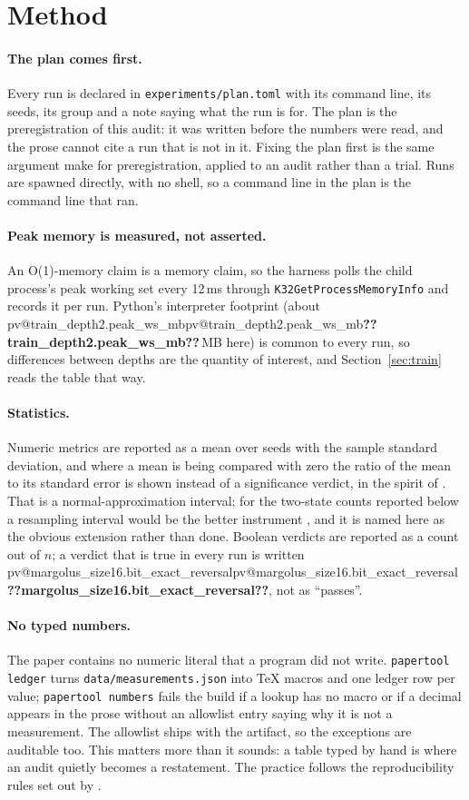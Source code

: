 \documentclass[11pt,a4paper]{article}
\makeatletter
\newcommand{\val}[1]{\ifcsname pv@#1\endcsname\csname pv@#1\endcsname\else\textbf{??#1??}\fi}
\makeatother
\begin{document}
\section{Method}
\label{sec:method}

\paragraph{The plan comes first.} Every run is declared in \texttt{experiments/plan.toml} with its
command line, its seeds, its group and a note saying what the run is for. The plan is the
preregistration of this audit: it was written before the numbers were read, and the prose cannot
cite a run that is not in it. Fixing the plan first is the same argument
\citet{nosek2018} make for preregistration, applied to an audit rather than a trial. Runs are spawned directly, with no shell, so a command line in the
plan is the command line that ran.

\paragraph{Peak memory is measured, not asserted.} An O(1)-memory claim is a memory claim, so the
harness polls the child process's peak working set every 12\,ms through
\texttt{K32GetProcessMemoryInfo} and records it per run. Python's interpreter footprint (about
\val{train_depth2.peak_ws_mb}\,MB here) is common to every run, so differences between depths
are the quantity of interest, and Section~\ref{sec:train} reads the table that way.

\paragraph{Statistics.} Numeric metrics are reported as a mean over seeds with the sample standard
deviation, and where a mean is being compared with zero the ratio of the mean to its standard
error is shown instead of a significance verdict, in the spirit of \citet{wasserstein2016}.
That is a normal-approximation interval; for the two-state counts reported below a resampling
interval would be the better instrument \citep{efron1993bootstrap}, and it is named here as the
obvious extension rather than done.
Boolean verdicts are reported as a count out of $n$; a verdict that is true in every run is
written \val{margolus_size16.bit_exact_reversal}, not as ``passes''.

\paragraph{No typed numbers.} The paper contains no numeric literal that a program did not write.
\texttt{papertool ledger} turns \texttt{data/measurements.json} into TeX macros and one ledger row
per value; \texttt{papertool numbers} fails the build if a lookup has no macro or if a decimal
appears in the prose without an allowlist entry saying why it is not a measurement. The allowlist
ships with the artifact, so the exceptions are auditable too. This matters more than it sounds: a
table typed by hand is where an audit quietly becomes a restatement. The practice follows the
reproducibility rules set out by \citet{sandve2013}.
\end{document}

